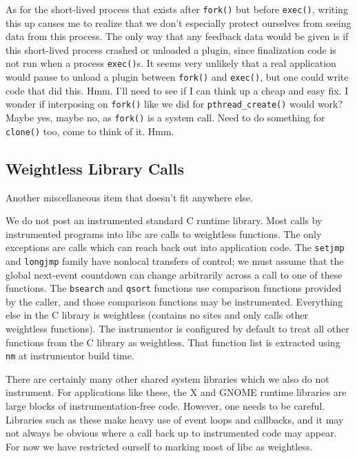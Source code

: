 \documentclass[times,10pt,twocolumn]{article}
\begin{document}
As for the short-lived process that exists after \texttt{fork()} but
before \texttt{exec()}, writing this up causes me to realize that we
don't especially protect ourselves from seeing data from this
process.  The only way that any feedback data would be given is if
this short-lived process crashed or unloaded a plugin, since
finalization code is not run when a process \texttt{exec()}s.  It
seems very unlikely that a real application would pause to unload a
plugin between \texttt{fork()} and \texttt{exec()}, but one could
write code that did this.  Hmm.  I'll need to see if I can think up a
cheap and easy fix.  I wonder if interposing on \texttt{fork()} like
we did for \texttt{pthread\_create()} would work?  Maybe yes, maybe
no, as \texttt{fork()} is a system call.  Need to do something for
\texttt{clone()} too, come to think of it.  Hmm.

\subsection{Weightless Library Calls}

Another miscellaneous item that doesn't fit anywhere else.

We do not post an instrumented standard C runtime library.  Most calls
by instrumented programs into libc are calls to weightless functions.
The only exceptions are calls which can reach back out into
application code.  The \texttt{setjmp} and \texttt{longjmp} family
have nonlocal transfers of control; we must assume that the global
next-event countdown can change arbitrarily across a call to one of
these functions.  The \texttt{bsearch} and \texttt{qsort} functions
use comparison functions provided by the caller, and those comparison
functions may be instrumented.  Everything else in the C library is
weightless (contains no sites and only calls other weightless
functions).  The instrumentor is configured by default to treat all
other functions from the C library as weightless.  That function list
is extracted using \texttt{nm} at instrumentor build time.

There are certainly many other shared system libraries which we also
do not instrument.  For applications like these, the X and GNOME
runtime libraries are large blocks of instrumentation-free code.
However, one needs to be careful.  Libraries such as these make heavy
use of event loops and callbacks, and it may not always be obvious
where a call back up to instrumented code may appear.  For now we have
restricted ourself to marking most of libc as weightless.
\end{document}
